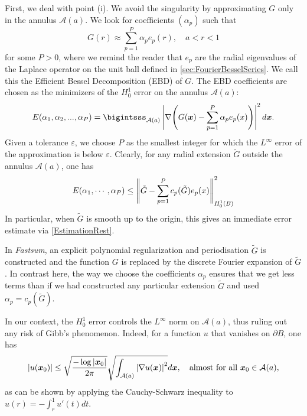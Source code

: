 \documentclass[smallextended]{svjour3}
\begin{document}
First, we deal with point (i). We avoid the singularity by approximating $G$ only in the annulus $\mathcal{A}(a)$. We look for coefficients $(\alpha_p)$ such that
\begin{equation}
	G(r) \approx \sum_{p = 1}^P \alpha_p e_p(r), \quad  a< r < 1
	\label{temp2}
\end{equation}
for some $P>0$, where we remind the reader that $e_p$ are the radial eigenvalues of the Laplace operator on the unit ball defined in \autoref{sec:FourierBesselSeries}. We call this the Efficient Bessel Decomposition (EBD) of $G$. The EBD coefficients are chosen as the minimizers of the $H^1_0$ error on the annulus $\mathcal{A}(a)$:
\[ E(\alpha_1,\alpha_2,...,\alpha_P) = \bigintsss_{\mathcal{A}(a)} \left|\nabla \!\left( G(\bs{x}) - \sum_{p=1}^P \alpha_p e_p(x)\right)\right|^2d\bs{x}.\] 
Given a tolerance $\varepsilon$, we choose $P$ as the smallest integer for which the $L^\infty$ error of the approximation is below $\varepsilon$. Clearly, for any radial extension $\tilde{G}$ outside the annulus $\mathcal{A}(a)$, one has 
\begin{equation}
	E(\alpha_1,\cdots,\alpha_P) \leq \left\|\tilde{G} - \sum_{p = 1}^P c_p(\tilde{G})e_p(x)\right\|^2_{H^1_0(B)}
	\label{estimParProlongement}
\end{equation}
In particular, when $\tilde{G}$ is smooth up to the origin, this gives an immediate error estimate via \autoref{EstimationRest}. 
\begin{remark}
	\label{RemarkPotts}
	In \textit{Fastsum}, an explicit polynomial regularization and periodisation $\tilde{G}$ is constructed and the function $G$ is replaced by the discrete Fourier expansion of $\tilde{G}$. In contrast here, the way we choose the coefficients $\alpha_p$ ensures that we get less terms than if we had constructed any particular extension $\tilde{G}$ and used $\alpha_p = c_p(\tilde{G})$. 
\end{remark}
\begin{remark}
	\label{RemLinf}
	In our context, the $H_0^1$ error controls the $L^{\infty}$ norm on $\mathcal{A}(a)$, thus ruling out any risk of Gibb's phenomenon. Indeed, for a function $u$ that vanishes on $\partial B$, one has
	\[\left\lvert u(\boldsymbol{x}_0) \right\rvert \leq \sqrt{\dfrac{-\log \left\lvert \boldsymbol{x}_0 \right\rvert}{2\pi}}\sqrt{\int_{\mathcal{A}(a)} \left\lvert \nabla u(\boldsymbol{x}) \right\rvert^2} d\boldsymbol{x},\quad  \text{almost for all }\boldsymbol{x}_0 \in \mathcal{A}(a),\]
	as can be shown by applying the Cauchy-Schwarz inequality to $u(r) = -\int_{r}^{1} u'(t)dt.$
\end{remark}	
			
\end{document}
